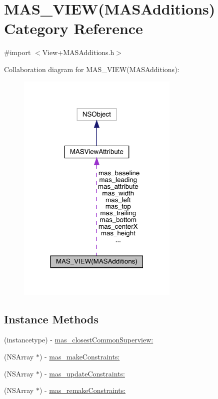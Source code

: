 \hypertarget{category_m_a_s___v_i_e_w_07_m_a_s_additions_08}{}\section{M\+A\+S\+\_\+\+V\+I\+EW(M\+A\+S\+Additions) Category Reference}
\label{category_m_a_s___v_i_e_w_07_m_a_s_additions_08}


{\ttfamily \#import $<$View+\+M\+A\+S\+Additions.\+h$>$}



Collaboration diagram for M\+A\+S\+\_\+\+V\+I\+EW(M\+A\+S\+Additions)\+:\nopagebreak
\begin{figure}[H]
\begin{center}
\leavevmode
\includegraphics[width=218pt]{category_m_a_s___v_i_e_w_07_m_a_s_additions_08__coll__graph}
\end{center}
\end{figure}
\subsection*{Instance Methods}
\begin{DoxyCompactItemize}
\item 
(instancetype) -\/ \mbox{\hyperlink{category_m_a_s___v_i_e_w_07_m_a_s_additions_08_a2250c9c7f218a7db066e3455d4fe8427}{mas\+\_\+closest\+Common\+Superview\+:}}
\item 
(N\+S\+Array $\ast$) -\/ \mbox{\hyperlink{category_m_a_s___v_i_e_w_07_m_a_s_additions_08_adc79101b45c8547ac63faf1ee3c81057}{mas\+\_\+make\+Constraints\+:}}
\item 
(N\+S\+Array $\ast$) -\/ \mbox{\hyperlink{category_m_a_s___v_i_e_w_07_m_a_s_additions_08_a7e717094d6073368dc2d3e8a56377e84}{mas\+\_\+update\+Constraints\+:}}
\item 
(N\+S\+Array $\ast$) -\/ \mbox{\hyperlink{category_m_a_s___v_i_e_w_07_m_a_s_additions_08_a694b415beed5f32c5d1215f988bca6d0}{mas\+\_\+remake\+Constraints\+:}}
\end{DoxyCompactItemize}
